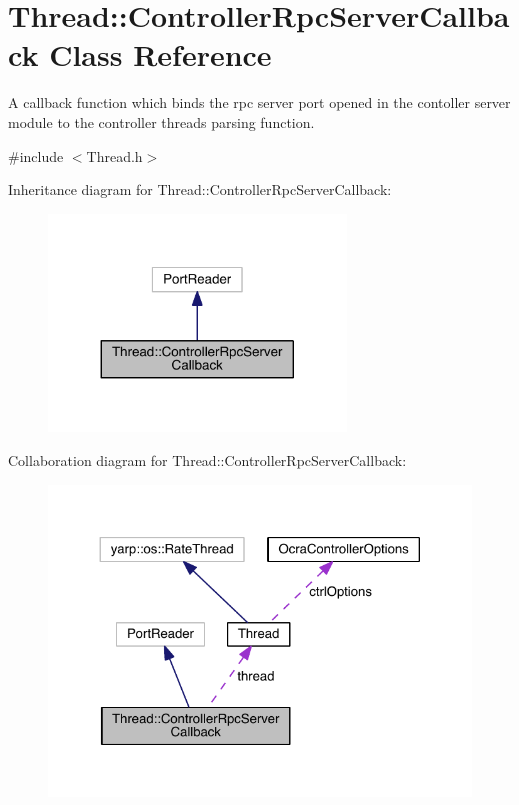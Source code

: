 \hypertarget{classThread_1_1ControllerRpcServerCallback}{}\section{Thread\+:\+:Controller\+Rpc\+Server\+Callback Class Reference}
\label{classThread_1_1ControllerRpcServerCallback}


A callback function which binds the rpc server port opened in the contoller server module to the controller thread\textquotesingle{}s parsing function.  




{\ttfamily \#include $<$Thread.\+h$>$}



Inheritance diagram for Thread\+:\+:Controller\+Rpc\+Server\+Callback\+:\nopagebreak
\begin{figure}[H]
\begin{center}
\leavevmode
\includegraphics[width=224pt]{classThread_1_1ControllerRpcServerCallback__inherit__graph}
\end{center}
\end{figure}


Collaboration diagram for Thread\+:\+:Controller\+Rpc\+Server\+Callback\+:\nopagebreak
\begin{figure}[H]
\begin{center}
\leavevmode
\includegraphics[width=324pt]{classThread_1_1ControllerRpcServerCallback__coll__graph}
\end{center}
\end{figure}
